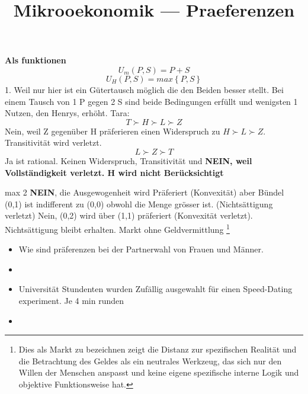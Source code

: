 \documentclass[a4paper]{article}
\title{\textbf{Mikrooekonomik — Praeferenzen}}
\begin{document}
    \maketitle
    
    \textbf{Als funktionen}
    \begin{equation}
        U_m(P,S) = P + S 
    \end{equation}
    \begin{equation}
        U_H (P,S) = max\left\{P,S\right\}
    \end{equation}
    1. Weil nur hier ist ein Gütertausch möglich die den Beiden besser stellt. Bei einem Tausch von 1 P gegen 2 S sind beide Bedingungen erfüllt und wenigsten 1 Nutzen, den Henrys, erhöht.
    Tara:
    \begin{equation}
      T \succ H \succ L \succ Z 
    \end{equation}
    Nein, weil Z gegenüber H präferieren einen Widerspruch zu $H \succ L \succ Z $. Transitivität wird verletzt.
    \begin{equation}
       L \succ Z \succ T 
    \end{equation}
    Ja ist rational. Keinen Widerspruch, Transitivität und 
    \textbf{NEIN, weil Vollständigkeit verletzt. H wird nicht Berücksichtigt}
    
    max 2 
    \textbf{NEIN}, die Ausgewogenheit wird Präferiert (Konvexität) aber Bündel (0,1) ist indifferent zu (0,0) obwohl die Menge grösser ist. (Nichtsättigung verletzt)
    Nein, (0,2) wird über (1,1) präferiert (Konvexität verletzt). Nichtsättigung bleibt erhalten.
    Markt ohne Geldvermittlung \footnote{Dies als Markt zu bezeichnen zeigt die Distanz zur spezifischen Realität und die Betrachtung des Geldes als ein neutrales Werkzeug, das sich nur den Willen der Menschen anspasst und keine eigene spezifische interne Logik und objektive Funktionsweise hat.}
    \begin{itemize}
        \item Wie sind präferenzen bei der Partnerwahl von Frauen und Männer.
        \item 
    \end{itemize}
    \begin{itemize}
        \item Universität Stundenten wurden Zufällig ausgewahlt für einen Speed-Dating experiment. Je 4 min runden
        \item 
    \end{itemize}
\end{document}
